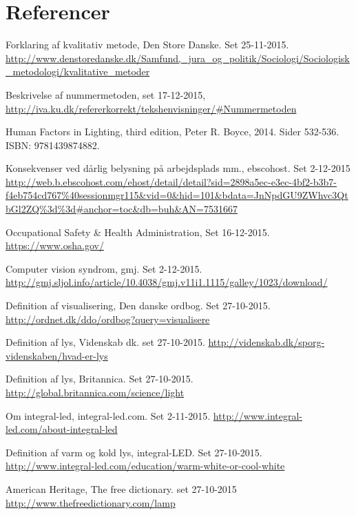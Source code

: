 \section{Referencer}

\begin{thebibliography}{99}


  Forklaring af kvalitativ metode,
  Den Store Danske.
  Set 25-11-2015.
  \url{http://www.denstoredanske.dk/Samfund,_jura_og_politik/Sociologi/Sociologisk_metodologi/kvalitative_metoder}

  Beskrivelse af nummermetoden, set 17-12-2015,
  \url{http://iva.ku.dk/refererkorrekt/tekshenvisninger/#Nummermetoden}

  Human Factors in Lighting, third edition,
  Peter R. Boyce, 2014.
  Sider 532-536.
  ISBN: 9781439874882.

  Konsekvenser ved dårlig belysning på arbejdsplads mm.,
  ebscohost.
  Set 2-12-2015
  \url{http://web.b.ebscohost.com/ehost/detail/detail?sid=2898a5ec-e3ec-4bf2-b3b7-f4eb754cd767%40sessionmgr115&vid=0&hid=101&bdata=JnNpdGU9ZWhvc3QtbGl2ZQ%3d%3d#anchor=toc&db=buh&AN=7531667}

  Occupational Safety \& Health Administration,
  Set 16-12-2015.
  \url{https://www.osha.gov/}
  
  Computer vision syndrom,
  gmj.
  Set 2-12-2015.
  \url{http://gmj.sljol.info/article/10.4038/gmj.v11i1.1115/galley/1023/download/}
  
  Definition af visualisering,
  Den danske ordbog.
  Set 27-10-2015.
  \url{http://ordnet.dk/ddo/ordbog?query=visualisere}
  
  Definition af lys,
  Videnskab dk.
  set 27-10-2015.
  \url{http://videnskab.dk/sporg-videnskaben/hvad-er-lys}
  
  Definition af lys,
  Britannica.
  Set 27-10-2015.
  \url{http://global.britannica.com/science/light}

  Om integral-led,
  integral-led.com.
  Set 2-11-2015.
  \url{http://www.integral-led.com/about-integral-led}
  
  Definition af varm og kold lys,
  integral-LED.
  Set 27-10-2015.
  \url{http://www.integral-led.com/education/warm-white-or-cool-white}

  American Heritage,
  The free dictionary.
  set 27-10-2015
  \url{http://www.thefreedictionary.com/lamp}


\end{thebibliography}
